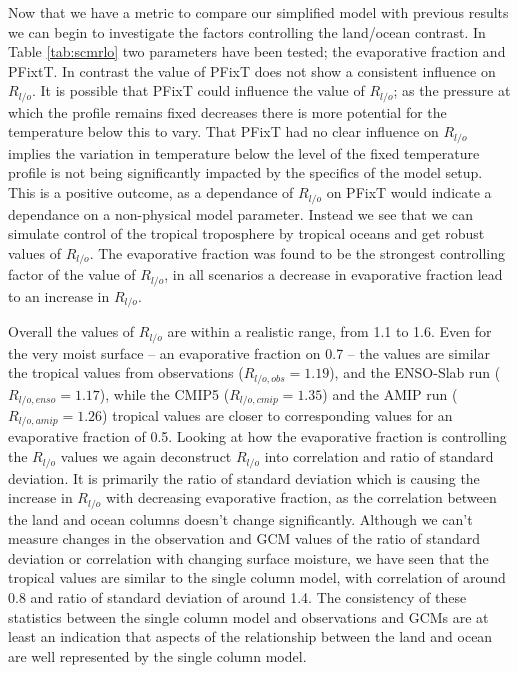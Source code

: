 Now that we have a metric to compare our simplified model with previous results 
we can begin to investigate the factors controlling the land/ocean contrast. In 
Table \ref{tab:scmrlo} two parameters have been tested; the evaporative fraction 
and PFixtT. In contrast the value of PFixT does not show a consistent influence 
on $R_{l/o}$. It is possible that PFixT could influence the value of $R_{l/o}$; 
as the pressure at which the profile remains fixed decreases there is more 
potential for the temperature below this to vary.  That PFixT had no clear 
influence on $R_{l/o}$ implies the variation in temperature below the level of 
the fixed temperature profile is not being significantly impacted by the 
specifics of the model setup.  This is a positive outcome, as a dependance of 
$R_{l/o}$ on PFixT would indicate a dependance on a non-physical model 
parameter. Instead we see that we can simulate control of the tropical 
troposphere by tropical oceans and get robust values of $R_{l/o}$.
The evaporative fraction was found to be the strongest controlling factor of the 
value of $R_{l/o}$, in all scenarios a decrease in evaporative fraction lead to 
an increase in $R_{l/o}$.  


Overall the values of $R_{l/o}$ are within a realistic range, from 1.1 to 1.6.
Even for the very moist surface -- an evaporative fraction on 0.7 -- the values 
are similar the tropical values from observations ($R_{l/o, obs} =1.19$), and 
the ENSO-Slab run ($R_{l/o, enso} =1.17$), while the CMIP5 ($R_{l/o,cmip} 
=1.35$) and the AMIP run ($R_{l/o, amip} =1.26$) tropical values are closer to 
corresponding values for an evaporative fraction of 0.5. Looking at how the 
evaporative fraction is controlling the $R_{l/o}$ values we again deconstruct 
$R_{l/o}$ into correlation and ratio of standard deviation. It is primarily the 
ratio of standard deviation which is causing the increase in $R_{l/o}$ with 
decreasing evaporative fraction, as the correlation between the land and ocean 
columns doesn't change significantly.  Although we can't measure changes in the 
observation and GCM values of the ratio of standard deviation or correlation 
with changing surface moisture, we have seen that the tropical values are 
similar to the single column model, with correlation of around 0.8 and ratio of 
standard deviation of around 1.4.  The consistency of these statistics between 
the single column model and observations and GCMs are at least an indication 
that aspects of the relationship between the land and ocean are well represented 
by the single column model. 

